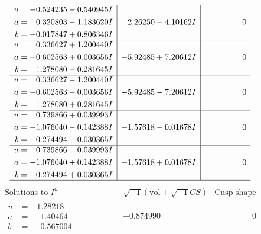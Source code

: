 \documentclass[1p]{elsarticle_modified}
\theoremstyle{definition}
\newcommand{\I}{\sqrt{-1}}
\begin{document}
$$\begin{array}{c|c|c}
\begin{aligned}
u &= -0.524235 - 0.540945 I \\
a &= \phantom{-}0.320803 - 1.183620 I \\
b &= -0.017847 + 0.806346 I\end{aligned}
 & \phantom{-}2.26250 - 4.10162 I & \phantom{-0.000000 } 0 \\ \hline\begin{aligned}
u &= \phantom{-}0.336627 + 1.200440 I \\
a &= -0.602563 + 0.003656 I \\
b &= \phantom{-}1.278080 - 0.281645 I\end{aligned}
 & -5.92485 + 7.20612 I & \phantom{-0.000000 } 0 \\ \hline\begin{aligned}
u &= \phantom{-}0.336627 - 1.200440 I \\
a &= -0.602563 - 0.003656 I \\
b &= \phantom{-}1.278080 + 0.281645 I\end{aligned}
 & -5.92485 - 7.20612 I & \phantom{-0.000000 } 0 \\ \hline\begin{aligned}
u &= \phantom{-}0.739866 + 0.039993 I \\
a &= -1.076040 - 0.142388 I \\
b &= \phantom{-}0.274494 - 0.030365 I\end{aligned}
 & -1.57618 - 0.01678 I & \phantom{-0.000000 } 0 \\ \hline\begin{aligned}
u &= \phantom{-}0.739866 - 0.039993 I \\
a &= -1.076040 + 0.142388 I \\
b &= \phantom{-}0.274494 + 0.030365 I\end{aligned}
 & -1.57618 + 0.01678 I & \phantom{-0.000000 } 0\\
 \hline 
 \end{array}$$\newpage$$\begin{array}{c|c|c}  
\text{Solutions to }I^u_{1}& \I (\text{vol} + \sqrt{-1}CS) & \text{Cusp shape}\\
 \hline 
\begin{aligned}
u &= -1.28218\phantom{ +0.000000I} \\
a &= \phantom{-}1.40464\phantom{ +0.000000I} \\
b &= \phantom{-}0.567004\phantom{ +0.000000I}\end{aligned}
 & -0.874990\phantom{ +0.000000I} & \phantom{-0.000000 } 0 \\ \hline\begin{aligned}

\end{aligned}
\end{array}$$
\end{document}
